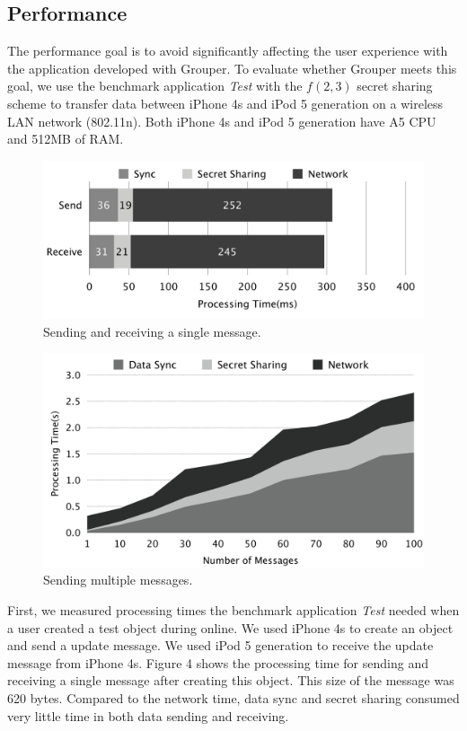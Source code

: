 \documentclass[twocolumn,10pt]{article}
\begin{document}
\subsection{Performance}

The performance goal is to avoid significantly affecting the user experience with the application developed with Grouper. 
To evaluate whether Grouper meets this goal, we use the benchmark application \emph{Test} with the $f(2, 3)$ secret sharing scheme to transfer data between iPhone 4s and iPod 5 generation on a wireless LAN network (802.11n). 
Both iPhone 4s and iPod 5 generation have A5 CPU and 512MB of RAM.

\begin{figure}[t]
	\centering
	\includegraphics[scale=0.12]{processing1}
	\caption{Sending and receiving a single message.}
\end{figure}

\begin{figure}[t]
	\centering
	\includegraphics[scale=0.12]{processing2}
	\caption{Sending multiple messages.}
\end{figure}

First, we measured processing times the benchmark application \emph{Test} needed when a user created a test object during online. 
We used iPhone 4s to create an object and send a update message. 
We used iPod 5 generation to receive the update message from iPhone 4s.
Figure 4 shows the processing time for sending and receiving a single message after creating this object.
This size of the message was 620 bytes.
Compared to the network time, data sync and secret sharing consumed very little time in both data sending and receiving.
\end{document}
